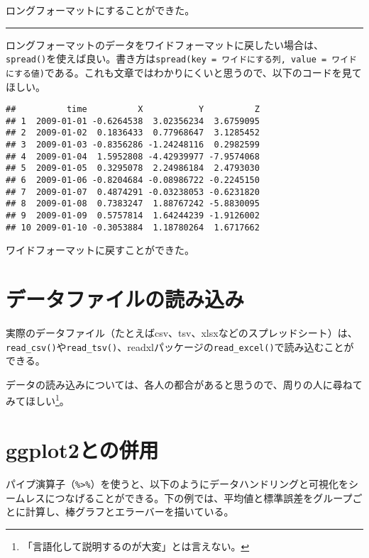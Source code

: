 \documentclass[]{book}
\newenvironment{Shaded}{\begin{snugshade}}{\end{snugshade}}
\newcommand{\KeywordTok}[1]{\textcolor[rgb]{0.13,0.29,0.53}{\textbf{#1}}}
\newcommand{\StringTok}[1]{\textcolor[rgb]{0.31,0.60,0.02}{#1}}
\newcommand{\OperatorTok}[1]{\textcolor[rgb]{0.81,0.36,0.00}{\textbf{#1}}}
\newcommand{\NormalTok}[1]{#1}
\let\rmarkdownfootnote\footnote%
\def\footnote{\protect\rmarkdownfootnote}
\begin{document}
ロングフォーマットにすることができた。

\begin{center}\rule{0.5\linewidth}{\linethickness}\end{center}

ロングフォーマットのデータをワイドフォーマットに戻したい場合は、\texttt{spread()}を使えば良い。書き方は\texttt{spread(key\ =\ ワイドにする列,\ value\ =\ ワイドにする値)}である。これも文章ではわかりにくいと思うので、以下のコードを見てほしい。

\begin{Shaded}
\end{Shaded}

\begin{verbatim}
##          time          X           Y          Z
## 1  2009-01-01 -0.6264538  3.02356234  3.6759095
## 2  2009-01-02  0.1836433  0.77968647  3.1285452
## 3  2009-01-03 -0.8356286 -1.24248116  0.2982599
## 4  2009-01-04  1.5952808 -4.42939977 -7.9574068
## 5  2009-01-05  0.3295078  2.24986184  2.4793030
## 6  2009-01-06 -0.8204684 -0.08986722 -0.2245150
## 7  2009-01-07  0.4874291 -0.03238053 -0.6231820
## 8  2009-01-08  0.7383247  1.88767242 -5.8830095
## 9  2009-01-09  0.5757814  1.64244239 -1.9126002
## 10 2009-01-10 -0.3053884  1.18780264  1.6717662
\end{verbatim}

ワイドフォーマットに戻すことができた。

\section{データファイルの読み込み}

実際のデータファイル（たとえばcsv、tsv、xlsxなどのスプレッドシート）は、\texttt{read\_csv()}や\texttt{read\_tsv()}、readxlパッケージの\texttt{read\_excel()}で読み込むことができる。

データの読み込みについては、各人の都合があると思うので、周りの人に尋ねてみてほしい\footnote{「言語化して説明するのが大変」とは言えない。}。

\section{ggplot2との併用}\label{ggplot2}

パイプ演算子（\texttt{\%\textgreater{}\%}）を使うと、以下のようにデータハンドリングと可視化をシームレスにつなげることができる。下の例では、平均値と標準誤差をグループごとに計算し、棒グラフとエラーバーを描いている。
\end{document}
